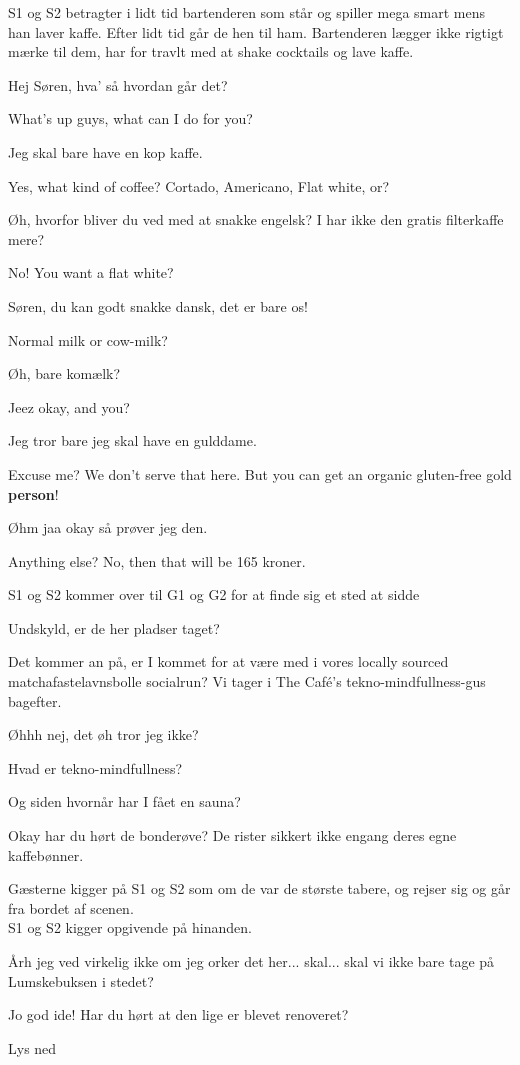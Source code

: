 \documentclass[a4paper,11pt]{article}
\begin{document}
\begin{sketch}
\scene S1 og S2 betragter i lidt tid bartenderen som står og spiller mega smart mens han laver kaffe. Efter lidt tid går de hen til ham. Bartenderen lægger ikke rigtigt mærke til dem, har for travlt med at shake cocktails og lave kaffe. 

 Hej Søren, hva' så hvordan går det?

 What's up guys, what can I do for you?

 Jeg skal bare have en kop kaffe.  

 Yes, what kind of coffee? Cortado, Americano, Flat white, or?

 Øh, hvorfor bliver du ved med at snakke engelsk? I har ikke den gratis filterkaffe mere?

  No! You want a flat white? 

 Søren, du kan godt snakke dansk, det er bare os! 

  Normal milk or cow-milk?

 Øh, bare komælk?

 Jeez okay, and you?

 Jeg tror bare jeg skal have en gulddame.

 Excuse me? We don't serve that here. But you can get an organic gluten-free gold \textbf{person}!

 Øhm jaa okay så prøver jeg den.  

 Anything else?  No, then that will be 165 kroner.

\scene S1 og S2 kommer over til G1 og G2 for at finde sig et sted at sidde

 Undskyld, er de her pladser taget?

 Det kommer an på, er I kommet for at være med i vores locally sourced matchafastelavnsbolle socialrun? Vi tager i The Café's tekno-mindfullness-gus bagefter. 

 Øhhh nej, det øh tror jeg ikke?

 Hvad er tekno-mindfullness?

 Og siden hvornår har I fået en sauna?

  Okay har du hørt de bonderøve? De rister sikkert ikke engang deres egne kaffebønner.

\scene Gæsterne kigger på S1 og S2 som om de var de største tabere, og rejser sig og går fra bordet af scenen.\\S1 og S2 kigger opgivende på hinanden.

 Årh jeg ved virkelig ikke om jeg orker det her... skal... skal vi ikke bare tage på Lumskebuksen i stedet? 

 Jo god ide!  Har du hørt at den lige er blevet renoveret? 

\scene Lys ned

\end{sketch}
\end{document}

